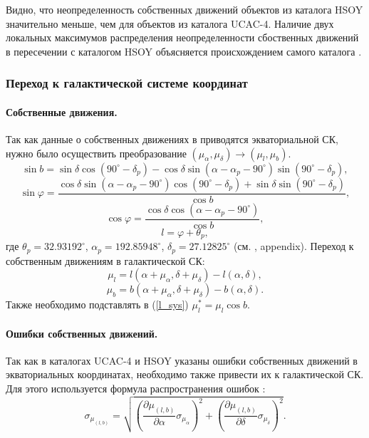 \documentclass{matmex-diploma-custom}
\begin{document}
Видно, что неопределенность собственных движений объектов из каталога HSOY значительно меньше, чем для объектов из каталога UCAC-4. Наличие двух локальных максимумов распределения неопределенности сбоственных движений в пересечении с каталогом HSOY объясняется происхождением самого каталога \cite{HSOY}.
\pagebreak
\subsubsection{Переход к галактической системе координат}
\par \paragraph{Собственные движения.} 
Так как данные о собственных движениях в приводятся экваториальной СК, нужно было осуществить преобразование $(\mu_{\alpha}, \mu_{\delta}) \rightarrow (\mu_l, \mu_b)$.
\begin{equation}
        \sin{b} = \sin{\delta} \cos(90^{\circ} - \delta_p) - \cos{\delta} \sin(\alpha - \alpha_p - 90^{\circ}) \sin(90^{\circ} - \delta_p),
\end{equation}
\begin{equation}
        \sin{\varphi} = \frac{\cos{\delta} \sin(\alpha - \alpha_p - 90^{\circ}) \cos(90^{\circ} - \delta_p) + \sin{\delta} \sin(90^{\circ} - \delta_p)}{\cos{b}},
\end{equation}
\begin{equation}
        \cos{\varphi} = \frac{ \cos{\delta} \cos(\alpha - \alpha_p - 90^{\circ})}{\cos{b}},
\end{equation}
\begin{equation}
        l = \varphi + \theta_p,
\end{equation}
где $\theta_p = 32.93192^{\circ}$, $\alpha_p = 192.85948^{\circ}$, $\delta_p = 27.12825^{\circ}$ (см. \cite{ReidSolo}, appendix). Переход к собственным движениям в галактической СК:
\begin{equation}
        \mu_l = l(\alpha + \mu_{\alpha}, \delta + \mu_{\delta}) - l(\alpha, \delta),
\end{equation}
\begin{equation}
        \mu_b = b(\alpha + \mu_{\alpha}, \delta + \mu_{\delta}) - b(\alpha, \delta).
\end{equation}
Также необходимо подставлять в (\ref{l_sys}) $\mu_l^* = \mu_l \cos{b}$.

\par \paragraph{Ошибки собственных движений.} 
\par Так как в каталогах UCAC-4 и HSOY указаны ошибки собственных движений в экваториальных координатах, необходимо также привести их к галактической СК. Для этого используется формула распространения ошибок \cite{Agekyan}:
\begin{equation}
        \sigma_{\mu_{(l, b)}} = \sqrt{\left(\frac{\partial \mu_{(l, b)}}{\partial \alpha} \sigma_{\mu_{\alpha}} \right)^2 + \left(\frac{\partial \mu_{(l, b)}}{\partial\delta} \sigma_{\mu_{\delta}} \right)^2}.
\end{equation}
\end{document}
